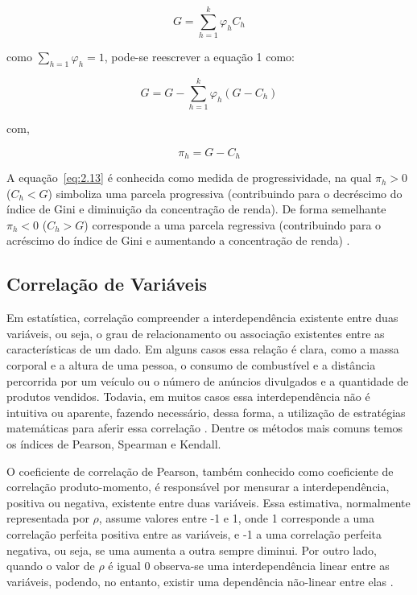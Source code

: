 \begin{equation}
	G = \sum_{h=1}^{k} \varphi_h C_h
\end{equation}

\noindent como $\sum_{h=1}^{} \varphi_h = 1$, pode-se reescrever a equação 1 como:

\begin{equation}
	G = G - \sum_{h=1}^{k} \varphi_h (G - C_h)
\end{equation}

\noindent com, 

\begin{equation}
	\pi_h = G - C_h
	\label{eq:2.13}
\end{equation}

A equação~\ref{eq:2.13} é conhecida como medida de progressividade, na qual $\pi_h > 0$ ($C_h < G$) simboliza uma parcela progressiva (contribuindo para o decréscimo do índice de Gini e diminuição da concentração de renda). De forma semelhante $\pi_h < 0$ ($C_h > G$) corresponde a uma parcela regressiva (contribuindo para o acréscimo do índice de Gini e aumentando a concentração de renda) \cite{cap02_ref22}.

\subsection{Correlação de Variáveis}\label{cap:referencias:correlacao}

Em estatística, correlação compreender a interdependência existente entre duas variáveis, ou seja, o grau de relacionamento ou associação existentes entre as características de um dado. Em alguns casos essa relação é clara, como a massa corporal e a altura de uma pessoa, o consumo de combustível e a distância percorrida por um veículo ou o número de anúncios divulgados e a quantidade de produtos vendidos. Todavia, em muitos casos essa interdependência não é intuitiva ou aparente, fazendo necessário, dessa forma, a utilização de estratégias matemáticas para aferir essa correlação \cite{cap02_ref39}. Dentre os métodos mais comuns temos os índices de Pearson, Spearman e Kendall.

O coeficiente de correlação de Pearson, também conhecido como coeficiente de correlação produto-momento, é responsável por mensurar a interdependência, positiva ou negativa, existente entre duas variáveis. Essa estimativa, normalmente representada por $\rho$, assume valores entre -1 e 1, onde 1 corresponde a uma correlação perfeita positiva entre as variáveis, e -1 a uma correlação perfeita negativa, ou seja, se uma aumenta a outra sempre diminui. Por outro lado, quando o valor de $\rho$ é igual 0 observa-se uma interdependência linear entre as variáveis, podendo, no entanto, existir uma dependência não-linear entre elas \cite{cap02_ref41, cap02_ref40}.

